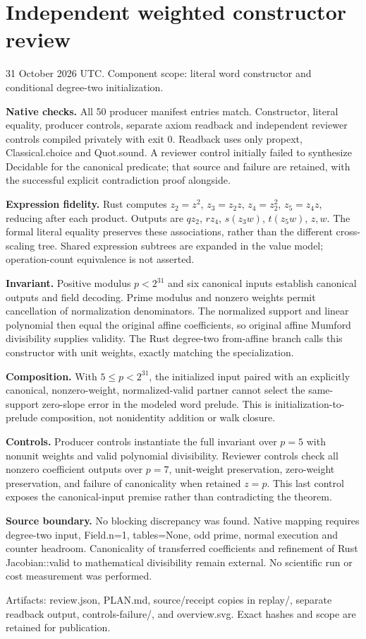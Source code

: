 \documentclass[11pt]{article}
\begin{document}
\section*{Independent weighted constructor review}
31 October 2026 UTC. Component scope: literal word constructor and conditional degree-two initialization.

\textbf{Native checks.} All 50 producer manifest entries match. Constructor, literal equality, producer controls, separate axiom readback and independent reviewer controls compiled privately with exit 0. Readback uses only propext, Classical.choice and Quot.sound. A reviewer control initially failed to synthesize Decidable for the canonical predicate; that source and failure are retained, with the successful explicit contradiction proof alongside.

\textbf{Expression fidelity.} Rust computes $z_2=z^2$, $z_3=z_2z$, $z_4=z_2^2$, $z_5=z_4z$, reducing after each product. Outputs are $qz_2$, $rz_4$, $s(z_3w)$, $t(z_5w)$, $z,w$. The formal literal equality preserves these associations, rather than the different cross-scaling tree. Shared expression subtrees are expanded in the value model; operation-count equivalence is not asserted.

\textbf{Invariant.} Positive modulus $p<2^{31}$ and six canonical inputs establish canonical outputs and field decoding. Prime modulus and nonzero weights permit cancellation of normalization denominators. The normalized support and linear polynomial then equal the original affine coefficients, so original affine Mumford divisibility supplies validity. The Rust degree-two from-affine branch calls this constructor with unit weights, exactly matching the specialization.

\textbf{Composition.} With $5\le p<2^{31}$, the initialized input paired with an explicitly canonical, nonzero-weight, normalized-valid partner cannot select the same-support zero-slope error in the modeled word prelude. This is initialization-to-prelude composition, not nonidentity addition or walk closure.

\textbf{Controls.} Producer controls instantiate the full invariant over $p=5$ with nonunit weights and valid polynomial divisibility. Reviewer controls check all nonzero coefficient outputs over $p=7$, unit-weight preservation, zero-weight preservation, and failure of canonicality when retained $z=p$. This last control exposes the canonical-input premise rather than contradicting the theorem.

\textbf{Source boundary.} No blocking discrepancy was found. Native mapping requires degree-two input, Field.n=1, tables=None, odd prime, normal execution and counter headroom. Canonicality of transferred coefficients and refinement of Rust Jacobian::valid to mathematical divisibility remain external. No scientific run or cost measurement was performed.

Artifacts: review.json, PLAN.md, source/receipt copies in replay/, separate readback output, controls-failure/, and overview.svg. Exact hashes and scope are retained for publication.
\end{document}
